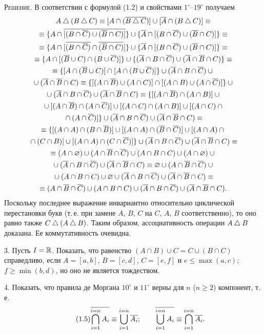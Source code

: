 \textsc{Решение.} В соответствии с формулой (1.2) и свойствами
$1^\circ$--$19^\circ$ получаем
\begin{gather*}
A\mathbin{\triangle}(B\mathbin{\triangle} C)\equiv[A\cap(\overline{B\mathbin{\triangle} C})]\cup[\overline{A}\cap(B\mathbin{\triangle} C)]\equiv\\
\equiv\{A\cap\overline{[(B\cap\overline{C})\cup(\overline{B}\cap C)]}\}\cup\{\overline{A}\cap[(B\cap\overline{C})\cup(\overline{B}\cap C)]\}\equiv\\
\equiv\{A\cap[\overline{(B\cap\overline{C})}\cap\overline{(\overline{B}\cap C)}]\}\cup\{\overline{A}\cap[(B\cap\overline{C})\cup(\overline{B}\cap C)]\}\equiv\\
\equiv\{A\cap[(\overline{B}\cup C)\cap(B\cup\overline{C})]\}\cup\{(\overline{A}\cap B\cap\overline{C})\cup(\overline{A}\cap\overline{B}\cap C)\}\equiv\\
\equiv\{[A\cap(\overline{B}\cup C)]\cap[A\cap(B\cup\overline{C})]\}\cup(\overline{A}\cap B\cap\overline{C})\cup{}\\
{}\cup(\overline{A}\cap\overline{B}\cap C)\equiv\{[(A\cap\overline{B})\cup(A\cap C)]\cap[(A\cap B)\cup(A\cap\overline{C})]\}\cup{}\\
{}\cup(\overline{A}\cap B\cap\overline{C})\cup(\overline{A}\cap\overline{B}\cap C)\equiv\{[(A\cap\overline{B})\cap(A\cap B)]\cup{}\\
{}\cup[(A\cap\overline{B})\cap(A\cap\overline{C})]\cup[(A\cap C)\cap(A\cap B)]\cup[(A\cap C)\cap{}\\
{}\cap(A\cap\overline{C})]\}\cup(\overline{A}\cap B\cap\overline{C})\cup(\overline{A}\cap\overline{B}\cap C)\equiv\\
\equiv\{[(A\cap A)\cap(B\cap\overline{B})]\cup[(A\cap A)\cap(\overline{B}\cap\overline{C})]\cup[(A\cap A)\cap{}\\
{}\cap(C\cap B)]\cup[(A\cap A)\cap(C\cap\overline{C})]\}\cup(\overline{A}\cap B\cap\overline{C})\cup(\overline{A}\cap\overline{B}\cap C)\equiv\\
\equiv(A\cap\varnothing)\cup(A\cap\overline{B}\cap\overline{C})\cup(A\cap B\cap C)\cup(A\cap\varnothing)\cup{}\\
{}\cup(\overline{A}\cap B\cap\overline{C})\cup(\overline{A}\cap\overline{B}\cap C)\equiv\varnothing\cup(A\cap\overline{B}\cap\overline{C})\cup{}\\
{}\cup(A\cap B\cap C)\cup\varnothing\cup(\overline{A}\cap B\cap\overline{C})\cup(\overline{A}\cap\overline{B}\cap C)\equiv\\
\equiv(A\cap\overline{B}\cap\overline{C})\cup(A\cap B\cap C)\cup(\overline{A}\cap B\cap\overline{C})\cup(\overline{A}\cap\overline{B}\cap C).
\end{gather*}
Поскольку последнее выражение инвариантно относительно циклической
перестановки букв (т.\,е. при замене $A$, $B$, $C$ на $C$, $A$, $B$
соответственно), то оно равно также $C\mathbin{\triangle}(A\mathbin{\triangle} B)$. Таким образом,
ассоциативность операции $A\mathbin{\triangle} B$ доказана. Ее коммутативность
очевидна.\fixed{в оригинале в восьмой строке выкладки стоит скобка
<<$([A\cap A)$>> вместо <<$[(A\cap A)$>>.}

3. Пусть $I=\mathbb R$. Показать, что равенство
$(A\cap B)\cup C=C\cup(B\cap C)$ справедливо, если $A=[a,b]$, $B=[c,d]$,
$C=[e,f]$ и $e\le\max(a,c)$; $f\ge\min(b,d)$, но оно не является
тождеством.

4. Показать, что правила де Моргана $10^\circ$ и $11^\circ$ верны для
$n$ ($n\ge2$) компонент, т.\,е.
\begin{equation}\tag{1.5}
\overline{\bigcap_{i=1}^{i=n}A_i}\equiv\bigcup_{i=1}^{i=n}\overline{A_i};\qquad
\overline{\bigcup_{i=1}^{i=n}A_i}\equiv\bigcap_{i=1}^{i=n}\overline{A_i}.
\end{equation}
